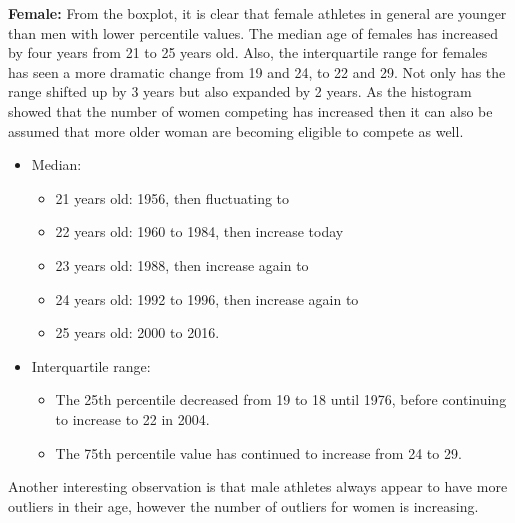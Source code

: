 \documentclass[a4 paper, 12pt]{article}
\begin{document}
        \textbf{Female:} From the boxplot, it is clear that female athletes in general are younger than men with lower percentile values. The median age of females has increased by four years from 21 to 25 years old. Also, the interquartile range for females has seen a more dramatic change from 19 and 24, to 22 and 29. Not only has the range shifted up by 3 years but also expanded by 2 years. As the histogram showed that the number of women competing has increased then it can also be assumed that more older woman are becoming eligible to compete as well. 
        \begin{itemize}
            \item Median:
                \begin{itemize}
                    \item 21 years old: 1956, then fluctuating to 
                    \item 22 years old: 1960 to 1984, then increase today
                    \item 23 years old: 1988, then increase again to
                    \item 24 years old: 1992 to 1996, then increase again to 
                    \item 25 years old: 2000 to 2016.
                \end{itemize}
            \item Interquartile range:
                \begin{itemize}
                    \item The 25th percentile decreased from 19 to 18 until 1976, before continuing to increase to 22 in 2004.
                    \item The 75th percentile value has continued to increase from 24 to 29. 
                \end{itemize}
        \end{itemize}
        Another interesting observation is that male athletes always appear to have more outliers in their age, however the number of outliers for women is increasing.
\end{document}
